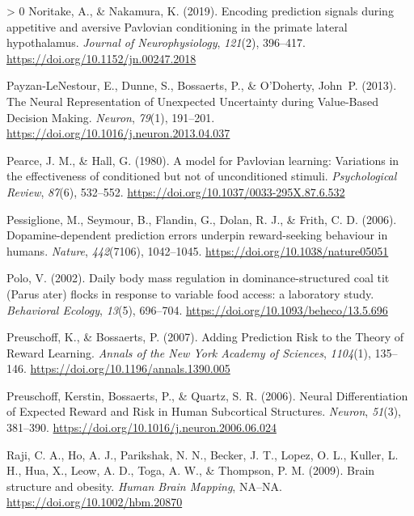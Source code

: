 \documentclass[
]{/home/nicoluarte/Downloads/templates/PNAS-template-main.tex}
\newlength{\cslhangindent}
\newenvironment{CSLReferences}[3] %
 {%
  \setlength{\parindent}{0pt}
  \ifodd #1 \everypar{\setlength{\hangindent}{\cslhangindent}}\ignorespaces\fi
  \ifnum #2 > 0
  \setlength{\parskip}{#2\baselineskip}
  \fi
 }%
 {}
\begin{document}
\begin{CSLReferences}{1}{0}
\leavevmode\hypertarget{ref-V2PX8TRL}{}%
Noritake, A., \& Nakamura, K. (2019). Encoding prediction signals during
appetitive and aversive Pavlovian conditioning in the primate lateral
hypothalamus. \emph{Journal of Neurophysiology}, \emph{121}(2),
396--417. \url{https://doi.org/10.1152/jn.00247.2018}

\leavevmode\hypertarget{ref-9Z525EYW}{}%
Payzan-LeNestour, E., Dunne, S., Bossaerts, P., \& O'Doherty, John~P.
(2013). The Neural Representation of Unexpected Uncertainty during
Value-Based Decision Making. \emph{Neuron}, \emph{79}(1), 191--201.
\url{https://doi.org/10.1016/j.neuron.2013.04.037}

\leavevmode\hypertarget{ref-NZFTTQJZ}{}%
Pearce, J. M., \& Hall, G. (1980). A model for Pavlovian learning:
Variations in the effectiveness of conditioned but not of unconditioned
stimuli. \emph{Psychological Review}, \emph{87}(6), 532--552.
\url{https://doi.org/10.1037/0033-295X.87.6.532}

\leavevmode\hypertarget{ref-87WR6HV3}{}%
Pessiglione, M., Seymour, B., Flandin, G., Dolan, R. J., \& Frith, C. D.
(2006). Dopamine-dependent prediction errors underpin reward-seeking
behaviour in humans. \emph{Nature}, \emph{442}(7106), 1042--1045.
\url{https://doi.org/10.1038/nature05051}

\leavevmode\hypertarget{ref-U2XEEC7Q}{}%
Polo, V. (2002). Daily body mass regulation in dominance-structured coal
tit (Parus ater) flocks in response to variable food access: a
laboratory study. \emph{Behavioral Ecology}, \emph{13}(5), 696--704.
\url{https://doi.org/10.1093/beheco/13.5.696}

\leavevmode\hypertarget{ref-3B7ZWETH}{}%
Preuschoff, K., \& Bossaerts, P. (2007). Adding Prediction Risk to the
Theory of Reward Learning. \emph{Annals of the New York Academy of
Sciences}, \emph{1104}(1), 135--146.
\url{https://doi.org/10.1196/annals.1390.005}

\leavevmode\hypertarget{ref-UKGJNWU7}{}%
Preuschoff, Kerstin, Bossaerts, P., \& Quartz, S. R. (2006). Neural
Differentiation of Expected Reward and Risk in Human Subcortical
Structures. \emph{Neuron}, \emph{51}(3), 381--390.
\url{https://doi.org/10.1016/j.neuron.2006.06.024}

\leavevmode\hypertarget{ref-5FBDWF55}{}%
Raji, C. A., Ho, A. J., Parikshak, N. N., Becker, J. T., Lopez, O. L.,
Kuller, L. H., Hua, X., Leow, A. D., Toga, A. W., \& Thompson, P. M.
(2009). Brain structure and obesity. \emph{Human Brain Mapping}, NA--NA.
\url{https://doi.org/10.1002/hbm.20870}


\end{CSLReferences}
\end{document}
